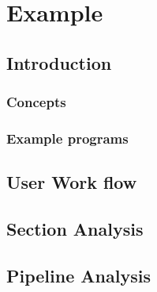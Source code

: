 \chapter{Example}

\section {Introduction}
\subsection{Concepts}
\subsection{Example programs}
\section {User Work flow}
\section {Section Analysis}
\section {Pipeline Analysis}
